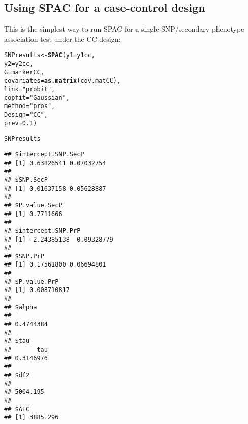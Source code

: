 \documentclass{article}\usepackage[]{graphicx}\usepackage[]{color}
\makeatletter
\newcommand{\hlnum}[1]{\textcolor[rgb]{0.686,0.059,0.569}{#1}}%
\newcommand{\hlstr}[1]{\textcolor[rgb]{0.192,0.494,0.8}{#1}}%
\newcommand{\hlstd}[1]{\textcolor[rgb]{0.345,0.345,0.345}{#1}}%
\newcommand{\hlkwb}[1]{\textcolor[rgb]{0.69,0.353,0.396}{#1}}%
\newcommand{\hlkwc}[1]{\textcolor[rgb]{0.333,0.667,0.333}{#1}}%
\newcommand{\hlkwd}[1]{\textcolor[rgb]{0.737,0.353,0.396}{\textbf{#1}}}%
\newenvironment{kframe}{%
 \def\at@end@of@kframe{}%
 \ifinner\ifhmode%
  \def\at@end@of@kframe{\end{minipage}}%
  \begin{minipage}{\columnwidth}%
 \fi\fi%
 \def\FrameCommand##1{\hskip\@totalleftmargin \hskip-\fboxsep
 \colorbox{shadecolor}{##1}\hskip-\fboxsep
     \hskip-\linewidth \hskip-\@totalleftmargin \hskip\columnwidth}%
 \MakeFramed {\advance\hsize-\width
   \@totalleftmargin\z@ \linewidth\hsize
   \@setminipage}}%
 {\par\unskip\endMakeFramed%
 \at@end@of@kframe}
\newenvironment{knitrout}{}{} %
\makeatother
\begin{document}
\subsection{Using SPAC for a case-control design}
\label{sec:using-SPAC-CC}
This is the simplest way to run SPAC for a single-SNP/secondary phenotype association test under the CC design:

\begin{knitrout}
\color{fgcolor}\begin{kframe}
\begin{alltt}
\hlstd{SNPresults} \hlkwb{<-} \hlkwd{SPAC}\hlstd{(}\hlkwc{y1} \hlstd{= y1cc,}
                   \hlkwc{y2} \hlstd{= y2cc,}
                   \hlkwc{G} \hlstd{= markerCC,}
                   \hlkwc{covariates} \hlstd{=} \hlkwd{as.matrix}\hlstd{(cov.matCC),}
                   \hlkwc{link} \hlstd{=} \hlstr{"probit"}\hlstd{,}
                   \hlkwc{copfit} \hlstd{=} \hlstr{"Gaussian"}\hlstd{,}
                   \hlkwc{method} \hlstd{=} \hlstr{"pros"}\hlstd{,}
                   \hlkwc{Design} \hlstd{=} \hlstr{"CC"}\hlstd{,}
                   \hlkwc{prev} \hlstd{=} \hlnum{0.1}\hlstd{)}
\end{alltt}


{\ttfamily\noindent\itshape\color{messagecolor}{\#\# Starting association analysis of the SNP...}}\begin{alltt}
\hlstd{SNPresults}
\end{alltt}
\begin{verbatim}
## $intercept.SNP.SecP
## [1] 0.63826541 0.07032754
## 
## $SNP.SecP
## [1] 0.01637158 0.05628887
## 
## $P.value.SecP
## [1] 0.7711666
## 
## $intercept.SNP.PrP
## [1] -2.24385138  0.09328779
## 
## $SNP.PrP
## [1] 0.17561800 0.06694801
## 
## $P.value.PrP
## [1] 0.008710817
## 
## $alpha
##           
## 0.4744384 
## 
## $tau
##       tau 
## 0.3146976 
## 
## $df2
##          
## 5004.195 
## 
## $AIC
## [1] 3885.296
\end{verbatim}
\end{kframe}
\end{knitrout}
\end{document}
